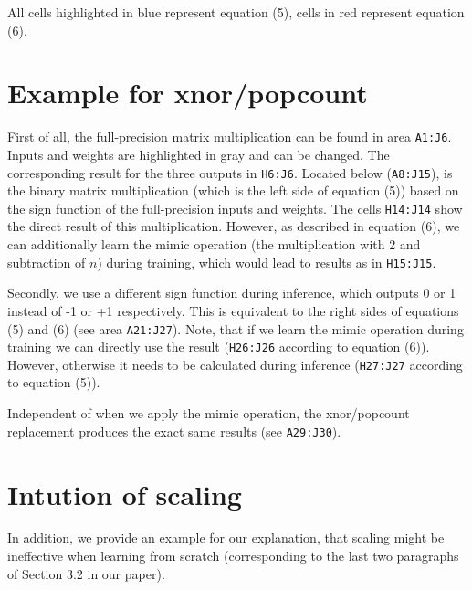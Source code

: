 \documentclass[10pt,twocolumn,letterpaper]{article}
\begin{document}
All cells highlighted in blue represent equation (5), cells in red represent equation (6).

\section{Example for xnor/popcount}
\label{sec:related}

First of all, the full-precision matrix multiplication can be found in area \texttt{A1:J6}.
Inputs and weights are highlighted in gray and can be changed.
The corresponding result for the three outputs in \texttt{H6:J6}.
Located below (\texttt{A8:J15}), is the binary matrix multiplication (which is the left side of equation (5)) based on the sign function of the full-precision inputs and weights.
The cells \texttt{H14:J14} show the direct result of this multiplication.
However, as described in equation (6), we can additionally learn the mimic operation (the multiplication with 2 and subtraction of $n$) during training, which would lead to results as in \texttt{H15:J15}.

Secondly, we use a different sign function during inference, which outputs 0 or 1 instead of -1 or +1 respectively.
This is equivalent to the right sides of equations (5) and (6) (see area \texttt{A21:J27}).
Note, that if we learn the mimic operation during training we can directly use the result (\texttt{H26:J26} according to equation (6)).
However, otherwise it needs to be calculated during inference (\texttt{H27:J27} according to equation (5)).

Independent of when we apply the mimic operation, the xnor/popcount replacement produces the exact same results (see \texttt{A29:J30}).

\section{Intution of scaling}
\label{sec:scaling}

In addition, we provide an example for our explanation, that scaling might be ineffective when learning from scratch (corresponding to the last two paragraphs of Section 3.2 in our paper).
\end{document}
